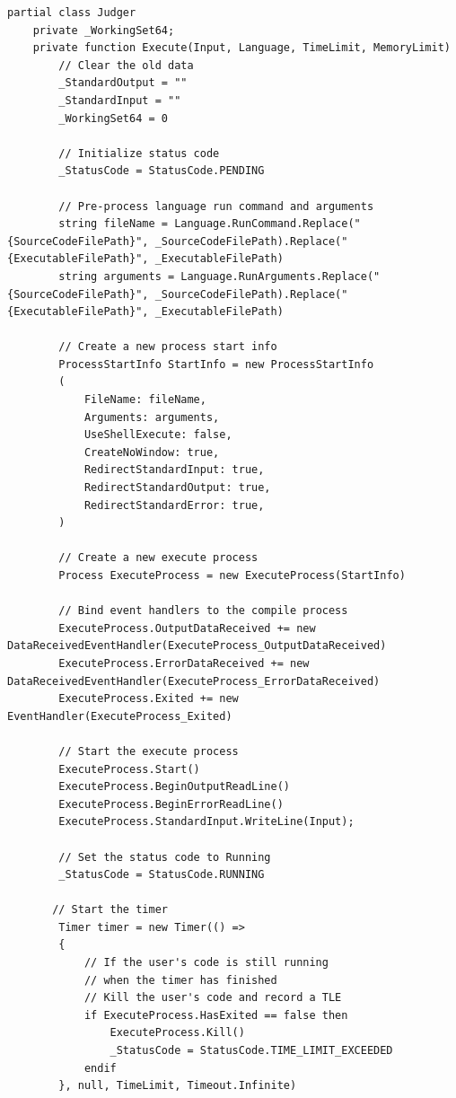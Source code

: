 \documentclass[a4paper]{report}
\begin{document}
\begin{verbatim}
partial class Judger
    private _WorkingSet64;
    private function Execute(Input, Language, TimeLimit, MemoryLimit)
        // Clear the old data
        _StandardOutput = ""
        _StandardInput = ""
        _WorkingSet64 = 0

        // Initialize status code
        _StatusCode = StatusCode.PENDING

        // Pre-process language run command and arguments
        string fileName = Language.RunCommand.Replace("{SourceCodeFilePath}", _SourceCodeFilePath).Replace("{ExecutableFilePath}", _ExecutableFilePath)
        string arguments = Language.RunArguments.Replace("{SourceCodeFilePath}", _SourceCodeFilePath).Replace("{ExecutableFilePath}", _ExecutableFilePath)

        // Create a new process start info
        ProcessStartInfo StartInfo = new ProcessStartInfo
        (
            FileName: fileName,
            Arguments: arguments,
            UseShellExecute: false,
            CreateNoWindow: true,
            RedirectStandardInput: true,
            RedirectStandardOutput: true,
            RedirectStandardError: true,
        )

        // Create a new execute process
        Process ExecuteProcess = new ExecuteProcess(StartInfo)

        // Bind event handlers to the compile process
        ExecuteProcess.OutputDataReceived += new DataReceivedEventHandler(ExecuteProcess_OutputDataReceived)
        ExecuteProcess.ErrorDataReceived += new DataReceivedEventHandler(ExecuteProcess_ErrorDataReceived)
        ExecuteProcess.Exited += new EventHandler(ExecuteProcess_Exited)
        
        // Start the execute process
        ExecuteProcess.Start()
        ExecuteProcess.BeginOutputReadLine()
        ExecuteProcess.BeginErrorReadLine()
        ExecuteProcess.StandardInput.WriteLine(Input);

        // Set the status code to Running
        _StatusCode = StatusCode.RUNNING
        
       // Start the timer
        Timer timer = new Timer(() => 
        {
            // If the user's code is still running 
            // when the timer has finished
            // Kill the user's code and record a TLE
            if ExecuteProcess.HasExited == false then
                ExecuteProcess.Kill()
                _StatusCode = StatusCode.TIME_LIMIT_EXCEEDED
            endif
        }, null, TimeLimit, Timeout.Infinite)


\end{verbatim}
\end{document}
